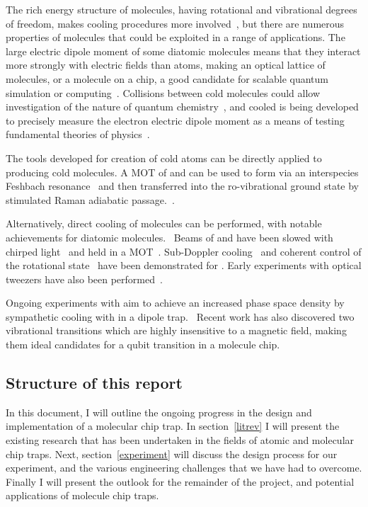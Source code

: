The rich energy structure of molecules, having rotational and vibrational
degrees of freedom, makes cooling procedures more involved~\cite{Tarbutt2018},
but there are numerous properties of molecules that could be exploited in a
range of applications. The large electric dipole moment of some diatomic
molecules means that they interact more strongly with electric fields than
atoms, making an optical lattice of molecules, or a molecule on a chip, a good
candidate for scalable quantum simulation or computing~\cite{Micheli2006,
Andre2006}.  Collisions between cold molecules could allow investigation of the
nature of quantum chemistry~\cite{Krems2008}, and cooled \YbF{} is being
developed to precisely measure the electron electric dipole moment as a means of
testing fundamental theories of physics~\cite{Lim2018}.

The tools developed for creation of cold atoms can be directly applied to
producing cold molecules. A MOT of \esRb{} and \ottCs{} can be used to form
\RbCs{} via an interspecies Feshbach resonance~\cite{PhysRevA.85.032506,
PhysRevA.89.033604} and then transferred into the ro-vibrational ground state by
stimulated Raman adiabatic passage.~\cite{PhysRevLett.113.255301,
RevModPhys.70.1003}.

Alternatively, direct cooling of molecules can be performed, with notable
achievements for diatomic molecules.~\cite{Shuman2010} Beams of \SrF{} and
\CaF{} have been slowed with chirped light~\cite{PhysRevLett.108.103002,
Truppe2017a} and held in a MOT~\cite{Barry2014, Williams2017}. Sub-Doppler
cooling~\cite{Truppe2017} and coherent control of the rotational
state~\cite{Williams2018, Blackmore_2018} have been demonstrated for
\CaF{}. Early experiments with optical tweezers have also been
performed~\cite{Anderegg2019}.


Ongoing experiments with \CaF{} aim to achieve an increased phase space density by
sympathetic cooling with \esRb{} in a dipole trap.~ Recent
work has also discovered two vibrational transitions which are highly
insensitive to a magnetic field, making them ideal candidates for a qubit
transition in a molecule chip. 

\subsection{Structure of this report}

In this document, I will outline the ongoing progress in the design and
implementation of a molecular chip trap. In section~\ref{litrev} I will present
the existing research that has been undertaken in the fields of atomic and
molecular chip traps. Next, section~\ref{experiment} will discuss the design
process for our experiment, and the various engineering challenges that we have
had to overcome. Finally I will present the outlook for the remainder of the
project, and potential applications of molecule chip traps.
